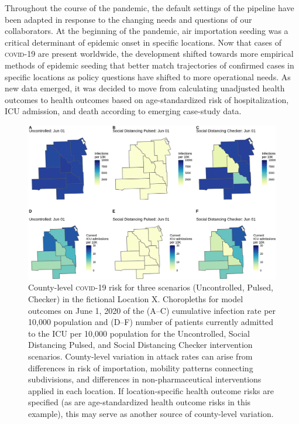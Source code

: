 {Throughout the course of the pandemic, the default settings of the pipeline have been adapted in response to the changing needs and questions of our collaborators. At the beginning of the pandemic, air importation seeding was a critical determinant of epidemic onset in specific locations. Now that cases of \textsc{covid}-19 are present worldwide, the development shifted towards more empirical methods of epidemic seeding that better match trajectories of confirmed cases in specific locations as policy questions have shifted to more operational needs. As new data emerged, it was decided to move from calculating unadjusted health outcomes to health outcomes based on age-standardized risk of hospitalization, ICU admission, and death according to emerging case-study data. 
\begin{figure}[!htb]%
    \centering
    \includegraphics{fig_pipeline/fig4a}
    \caption[County-level \textsc{covid}-19 risk for three scenarios]{County-level \textsc{covid}-19 risk for three scenarios (Uncontrolled, Pulsed, Checker) in the fictional Location X. Choropleths for model outcomes on June 1, 2020 of the (A–C) cumulative infection rate per 10,000 population and (D–F) number of patients currently admitted to the ICU per 10,000 population for the Uncontrolled, Social Distancing Pulsed, and Social Distancing Checker intervention scenarios. County-level variation in attack rates can arise from differences in risk of importation, mobility patterns connecting subdivisions, and differences in non-pharmaceutical interventions applied in each location. If location-specific health outcome risks are specified (as are age-standardized health outcome risks in this example), this may serve as another source of county-level variation.}
    \label{fig:pipeline-map}

\end{figure}}
